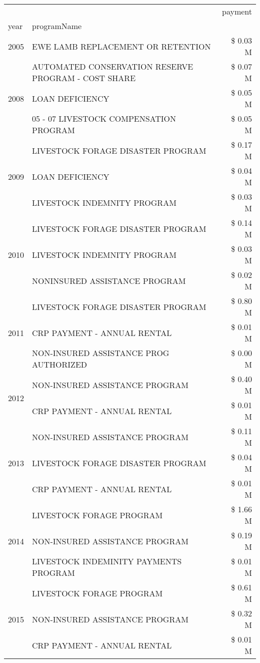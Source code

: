 \begin{tabular}{llr}
\toprule
 &  & payment \\
year & programName &  \\
\midrule
2005 & EWE LAMB REPLACEMENT OR RETENTION & \$ 0.03 M \\
\cline{1-3}
\multirow[t]{3}{*}{2008} & AUTOMATED CONSERVATION RESERVE PROGRAM - COST SHARE & \$ 0.07 M \\
 & LOAN DEFICIENCY & \$ 0.05 M \\
 & 05 - 07 LIVESTOCK COMPENSATION PROGRAM & \$ 0.05 M \\
\cline{1-3}
\multirow[t]{3}{*}{2009} & LIVESTOCK FORAGE DISASTER  PROGRAM & \$ 0.17 M \\
 & LOAN DEFICIENCY & \$ 0.04 M \\
 & LIVESTOCK INDEMNITY PROGRAM & \$ 0.03 M \\
\cline{1-3}
\multirow[t]{3}{*}{2010} & LIVESTOCK FORAGE DISASTER PROGRAM & \$ 0.14 M \\
 & LIVESTOCK INDEMNITY PROGRAM & \$ 0.03 M \\
 & NONINSURED ASSISTANCE PROGRAM & \$ 0.02 M \\
\cline{1-3}
\multirow[t]{3}{*}{2011} & LIVESTOCK FORAGE DISASTER PROGRAM & \$ 0.80 M \\
 & CRP PAYMENT - ANNUAL RENTAL & \$ 0.01 M \\
 & NON-INSURED ASSISTANCE PROG AUTHORIZED & \$ 0.00 M \\
\cline{1-3}
\multirow[t]{2}{*}{2012} & NON-INSURED ASSISTANCE PROGRAM & \$ 0.40 M \\
 & CRP PAYMENT - ANNUAL RENTAL & \$ 0.01 M \\
\cline{1-3}
\multirow[t]{3}{*}{2013} & NON-INSURED ASSISTANCE PROGRAM & \$ 0.11 M \\
 & LIVESTOCK FORAGE DISASTER PROGRAM & \$ 0.04 M \\
 & CRP PAYMENT - ANNUAL RENTAL & \$ 0.01 M \\
\cline{1-3}
\multirow[t]{3}{*}{2014} & LIVESTOCK FORAGE PROGRAM & \$ 1.66 M \\
 & NON-INSURED ASSISTANCE PROGRAM & \$ 0.19 M \\
 & LIVESTOCK INDEMINITY PAYMENTS PROGRAM & \$ 0.01 M \\
\cline{1-3}
\multirow[t]{3}{*}{2015} & LIVESTOCK FORAGE PROGRAM & \$ 0.61 M \\
 & NON-INSURED ASSISTANCE PROGRAM & \$ 0.32 M \\
 & CRP PAYMENT - ANNUAL RENTAL & \$ 0.01 M \\

\end{tabular}
